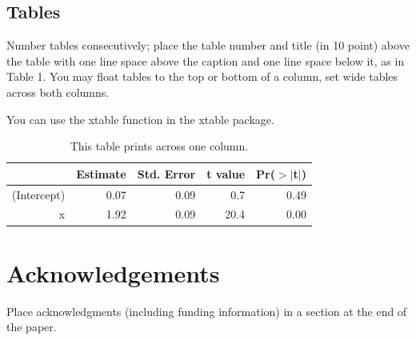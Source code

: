 \documentclass[11pt]{article}
\begin{document}
\subsection{Tables}\label{tables}

Number tables consecutively; place the table number and title (in 10
point) above the table with one line space above the caption and one
line space below it, as in Table 1. You may float tables to the top or
bottom of a column, set wide tables across both columns.

You can use the xtable function in the xtable package.

\begin{table}[H]
\centering
\begin{tabular}{rrrrr}
  \hline
 & Estimate & Std. Error & t value & Pr($>$$|$t$|$) \\ 
  \hline
(Intercept) & 0.07 & 0.09 & 0.7 & 0.49 \\ 
  x & 1.92 & 0.09 & 20.4 & 0.00 \\ 
   \hline
\end{tabular}
\caption{This table prints across one column.} 
\end{table}

\section{Acknowledgements}\label{acknowledgements}

Place acknowledgments (including funding information) in a section at
the end of the paper.



\end{document}
